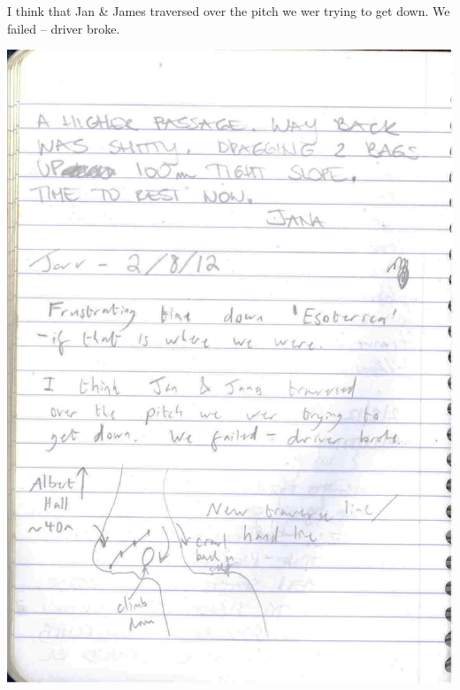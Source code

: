 I think that Jan \& James traversed over the pitch we wer trying to get
down. We failed -- driver broke.

\includegraphics{UgLog1012/82.jpeg}\\

